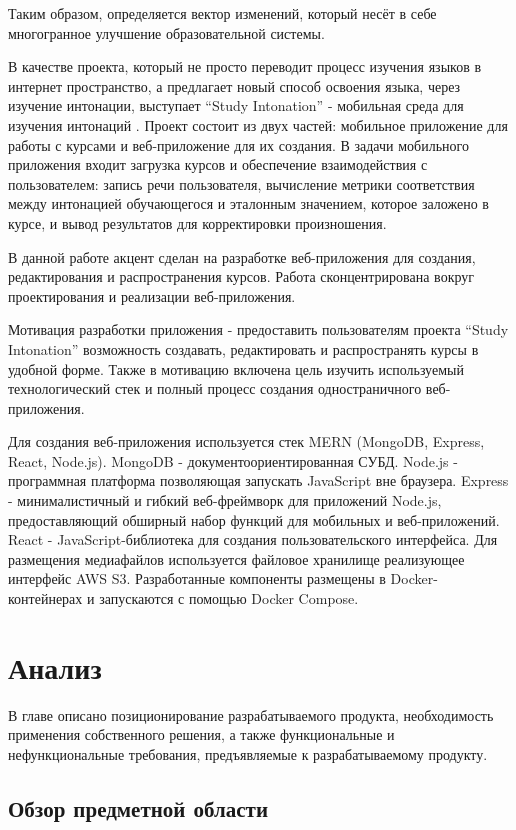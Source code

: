 \documentclass[%
  a5paper,
  subf,
  href,
  master,
  dotsinheaders 
]{csse-fcs}
\begin{document}
Таким образом, определяется вектор изменений, который несёт в себе многогранное улучшение образовательной системы.

В качестве проекта, который не просто переводит процесс изучения языков в интернет пространство, а предлагает новый способ освоения языка, через изучение интонации, выступает “Study Intonation” - мобильная среда для изучения интонаций \cite{lezhenin2017study}. Проект состоит из двух частей: мобильное приложение для работы с курсами и веб-приложение для их создания. В задачи мобильного приложения входит загрузка курсов и обеспечение взаимодействия с пользователем: запись речи пользователя, вычисление метрики соответствия между интонацией обучающегося и эталонным значением, которое заложено в курсе, и вывод результатов для корректировки произношения.

В данной работе акцент сделан на разработке веб-приложения для создания, редактирования и распространения курсов. Работа сконцентрирована вокруг проектирования и реализации веб-приложения.

Мотивация разработки приложения - предоставить пользователям проекта “Study Intonation” возможность создавать, редактировать и распространять курсы в удобной форме. Также в мотивацию включена цель изучить используемый технологический стек и полный процесс создания одностраничного веб-приложения.

Для создания веб-приложения используется стек MERN (MongoDB, Express, React, Node.js). MongoDB - документоориентированная СУБД. Node.js - программная платформа позволяющая запускать JavaScript вне браузера. Express - минималистичный и гибкий веб-фреймворк для приложений Node.js, предоставляющий обширный набор функций для мобильных и веб-приложений. React - JavaScript-библиотека для создания пользовательского интерфейса.
Для размещения медиафайлов используется файловое хранилище реализующее интерфейс AWS S3. Разработанные компоненты размещены в Docker-контейнерах и запускаются с помощью Docker Compose.


\chapter{Анализ}
 
В главе описано позиционирование разрабатываемого продукта, необходимость применения собственного решения, а также функциональные и нефункциональные требования, предъявляемые к разрабатываемому продукту.
 
\section{Обзор предметной области}
\end{document}
